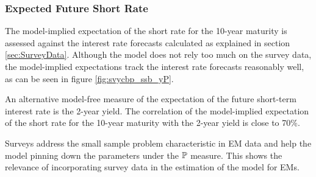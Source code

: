 {%

\subsubsection{Expected Future Short Rate} 
The model-implied expectation of the short rate for the 10-year maturity is assessed against the interest rate forecasts calculated as explained in section \ref{sec:SurveyData}. 
Although the model
does not rely too much on the survey data,
the model-implied expectations track the interest rate forecasts reasonably well, as can be seen in figure \ref{fig:svycbp_ssb_yP}.
%	


An alternative model-free measure of the expectation of the future short-term interest rate is the 2-year yield. The correlation of the model-implied expectation of the short rate for the 10-year maturity with the 2-year yield is close to 70\%.

Surveys address the small sample problem characteristic in EM data and help the model pinning down the parameters under the \(\mathbb{P}\) measure.
This shows the relevance of incorporating survey data in the estimation of the model for EMs.

}
